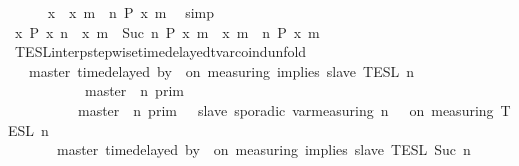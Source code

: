 \begin{isabellebody}
\ \ \ \ \isamarkupfalse%
\ {\isacartoucheopen}x\ {\isasymin}\ {\isacharbraceleft}x{\isachardot}\ {\isasymforall}m\ {\isasymge}\ n{\isachardot}\ P\ x\ m{\isacharbraceright}{\isacartoucheclose}\ \isamarkupfalse%
\ simp\isanewline
\ \ \isacommand{{\isacharbraceright}}\isamarkupfalse%
\ \isamarkupfalse%
\ {\isacartoucheopen}{\isacharbraceleft}x{\isachardot}\ P\ x\ n{\isacharbraceright}\ {\isasyminter}\ {\isacharbraceleft}x{\isachardot}\ {\isasymforall}m\ {\isasymge}\ Suc\ n{\isachardot}\ P\ x\ m{\isacharbraceright}\ {\isasymsubseteq}\ {\isacharbraceleft}x{\isachardot}\ {\isasymforall}m\ {\isasymge}\ n{\isachardot}\ P\ x\ m{\isacharbraceright}{\isacartoucheclose}\ \isacommand{{\isachardot}{\isachardot}}\isamarkupfalse%
\isanewline
{}\isamarkupfalse%
%
\endisatagproof
{\isafoldproof}%
%
\isadelimproof
\isanewline
%
\endisadelimproof
\isanewline
{}\isamarkupfalse%
\ TESL{\isacharunderscore}interp{\isacharunderscore}stepwise{\isacharunderscore}timedelayed{\isacharunderscore}tvar{\isacharunderscore}coind{\isacharunderscore}unfold{\isacharcolon}\isanewline
\ \ {\isacartoucheopen}{\isasymlbrakk}\ master\ time{\isacharminus}delayed{\isasymbowtie}\ by\ {\isasymdelta}{\isasymtau}\ on\ measuring\ implies\ slave\ {\isasymrbrakk}\isactrlsub T\isactrlsub E\isactrlsub S\isactrlsub L\isactrlbsup {\isasymge}\ n\isactrlesup \ {\isacharequal}\isanewline
\ \ \ \ \ {\isacharparenleft}\ \ \ \ \ {\isasymlbrakk}\ master\ {\isasymnot}{\isasymUp}\ n\ {\isasymrbrakk}\isactrlsub p\isactrlsub r\isactrlsub i\isactrlsub m\ \ \ \ \ \ \ \ \ \ \ \ \ \ \ %
\isanewline
\ \ \ \ \ \ \ \ {\isasymunion}\ {\isacharparenleft}{\isasymlbrakk}\ master\ {\isasymUp}\ n\ {\isasymrbrakk}\isactrlsub p\isactrlsub r\isactrlsub i\isactrlsub m\ {\isasyminter}\ {\isasymlbrakk}\ slave\ sporadic{\isasymsharp}\ {\isasymlparr}{\isasymtau}\isactrlsub v\isactrlsub a\isactrlsub r{\isacharparenleft}measuring{\isacharcomma}\ n{\isacharparenright}\ {\isasymoplus}\ {\isasymdelta}{\isasymtau}{\isasymrparr}\ on\ measuring\ {\isasymrbrakk}\isactrlsub T\isactrlsub E\isactrlsub S\isactrlsub L\isactrlbsup {\isasymge}\ n\isactrlesup {\isacharparenright}{\isacharparenright}\isanewline
\ \ \ \ \ \ \ \ \ \ \ \ \ \ \ \ \ \ \ \ \ \ \ \ \ \ \ \ \ \ \ \ \ \ \ \ \ \ \ \ \ \ \ \ \ %
\isanewline
\ \ \ \ \ {\isasyminter}\ {\isasymlbrakk}\ master\ time{\isacharminus}delayed{\isasymbowtie}\ by\ {\isasymdelta}{\isasymtau}\ on\ measuring\ implies\ slave\ {\isasymrbrakk}\isactrlsub T\isactrlsub E\isactrlsub S\isactrlsub L\isactrlbsup {\isasymge}\ Suc\ n\isactrlesup {\isacartoucheclose}\isanewline

\end{isabellebody}
